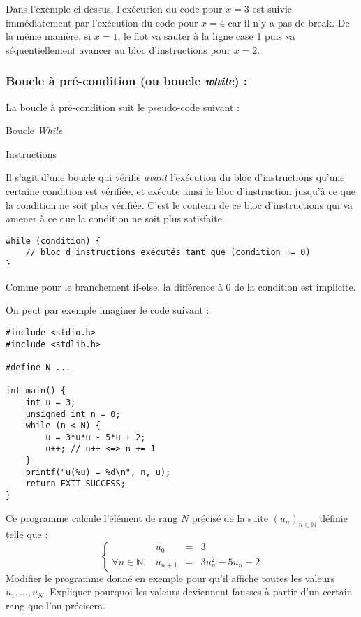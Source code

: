 \documentclass[../../../main.tex]{subfiles}
\begin{document}
Dans l'exemple ci-dessus, l'exécution du code pour $x = 3$ est suivie immédiatement par l'exécution du code pour $x = 4$ car il n'y a pas de \textsf{break}. De la même manière, si $x = 1$, le flot va sauter à la ligne \textsf{case 1} puis va séquentiellement avancer au bloc d'instructions pour $x = 2$.
\subsubsection{Boucle à pré-condition (ou boucle \textit{while}) :}
\label{ssub:boucle_pr_condition}
La boucle à pré-condition suit le pseudo-code suivant :
\begin{algorithm}
\caption{Boucle \textit{While}}
 {
	Instructions
}
\end{algorithm}
\newline
Il s'agit d'une boucle qui vérifie \textit{avant} l'exécution du bloc d'instructions qu'une certaine condition est vérifiée, et exécute ainsi le bloc d'instruction jusqu'à ce que la condition ne soit plus vérifiée. C'est le contenu de ce bloc d'instructions qui va amener à ce que la condition ne soit plus satisfaite.
\begin{verbatim}
while (condition) {
	// bloc d'instructions exécutés tant que (condition != 0)
}
\end{verbatim}
Comme pour le branchement \textsf{if-else}, la différence à 0 de la condition est implicite.
 
On peut par exemple imaginer le code suivant :
\begin{verbatim}
#include <stdio.h>
#include <stdlib.h>

#define N ...

int main() {
	int u = 3;
	unsigned int n = 0;
	while (n < N) {
		u = 3*u*u - 5*u + 2;
		n++; // n++ <=> n += 1
	}
	printf("u(%u) = %d\n", n, u);
	return EXIT_SUCCESS;
}
\end{verbatim}
Ce programme calcule l'élément de rang $N$ précisé de la suite $(u_{n})_{n\in{\mathbb{N}}}$ définie telle que :
$$
\left\{\begin{array}{llcl}
& u_{0} & = & 3 \\
\forall{n\in{\mathbb{N}}}, & u_{n+1} & = & 3u_{n}^{2} - 5u_{n} + 2
\end{array}\right.
$$
 Modifier le programme donné en exemple pour qu'il affiche toutes les valeurs $u_{1}, \dots, u_{N}$. \newline
Expliquer pourquoi les valeurs deviennent fausses à partir d'un certain rang que l'on précisera.
 
\end{document}
